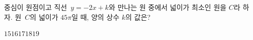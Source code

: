 중심이 원점이고 직선~$y=-2x+k$와 만나는 원 중에서 넓이가 최소인 원을 $C$라 하자. 원~$C$의 넓이가 $45\pi$일 때, 양의 상수 $k$의 값은?
\begin{choices32}{$15$}{$16$}{$17$}{$18$}{$19$}\end{choices32}
